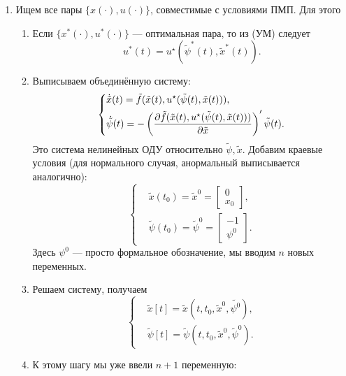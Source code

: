 \begin{enumerate}
    \item Ищем все пары $\{x(\cdot), u(\cdot)\}$, совместимые с условиями ПМП. Для этого
    \begin{enumerate}
        \item Если $\{x^*(\cdot), u^*(\cdot)\}$ --- оптимальная пара, то из (УМ) следует 
        $$
            u^*(t) = u^{\star}(\tilde{\psi}^*(t), \tilde{x}^*(t)).
        $$
        \item Выписываем объединённую систему:
        $$
            \left\{
                \begin{aligned}
                    & \dot{\tilde{x}}(t) = \tilde{f}(\tilde{x}(t), u^{\star}(\tilde{\psi}(t) ,\tilde{x}(t))), \\
                    & \dot{\tilde{\psi}}(t) = - \left(\dfrac{\partial \tilde{f}(\tilde{x}(t), u^{\star}(\tilde{\psi}(t) ,\tilde{x}(t)))}{\partial \tilde{x}}\right)' \tilde{\psi}(t).
                \end{aligned}
            \right.
        $$
        Это система нелинейных ОДУ относительно $\tilde{\psi}, \tilde{x}$. Добавим краевые условия (для нормального случая, анормальный выписывается аналогично):
        $$
            \left\{
                \begin{aligned}
                    & \tilde{x}(t_0) = \tilde{x}^0 = \begin{bmatrix} 0 \\ x_0 \end{bmatrix}, \\
                    & \tilde{\psi}(t_0) = \tilde{\psi}^0 = \begin{bmatrix} -1 \\ \psi^0 \end{bmatrix}.
                \end{aligned}
            \right.
        $$
        Здесь $\psi^0$ --- просто формальное обозначение, мы вводим $n$ новых переменных.
        \item Решаем систему, получаем
        $$
            \left\{
                \begin{aligned}
                    & \tilde{x}[t] = \tilde{x}(t, t_0, \tilde{x}^0, \tilde{\psi^0}), \\
                    & \tilde{\psi}[t] = \tilde{\psi}(t, t_0, \tilde{x}^0, \tilde{\psi}^0).
                \end{aligned}
            \right.
        $$
        \item К этому шагу мы уже ввели $n+1$ переменную:

\end{enumerate}
\end{enumerate}
